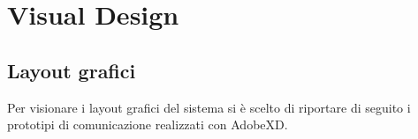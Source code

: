 
\chapter{Visual Design}\label{chap:visual-design}


\section{Layout grafici}\label{sec:layout-grafici}
Per visionare i layout grafici del sistema si è scelto di riportare di seguito 
i prototipi di comunicazione realizzati con AdobeXD.

